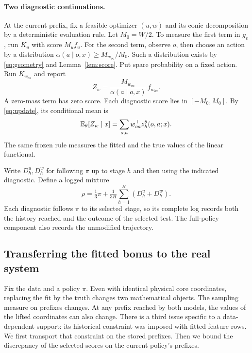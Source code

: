 \paragraph{Two diagnostic continuations.}
At the current prefix, fix a feasible optimizer $(u,w)$ and its conic decomposition by a deterministic evaluation rule. Let $M_0=W/2$. To measure the first term in $g_v$, run $K_u$ with score $M_u f_u$. For the second term, observe $o$, then choose an action by a distribution $\alpha(a\mid o,x)\ge M_{w_{oa}}/M_0$. Such a distribution exists by \eqref{eq:geometry} and Lemma~\ref{lem:score}. Put spare probability on a fixed action. Run $K_{w_{oa}}$ and report
\[
 Z_w=\frac{M_{w_{oa}}}{\alpha(a\mid o,x)}\,f_{w_{oa}} .
\]
A zero-mass term has zero score. Each diagnostic score lies in $[-M_0,M_0]$. By \eqref{eq:update}, its conditional mean is
\[
 \mathbb E_\theta[Z_w\mid x]=\sum_{o,a} w_{oa}^{\top}z_h^\theta(o,a;x).
\] The same frozen rule measures the fitted and the true values of the linear functional.

Write $D_h^u,D_h^w$ for following $\pi$ up to stage $h$ and then using the indicated diagnostic. Define a logged mixture
\begin{equation}
 \rho=\tfrac13\pi+\tfrac{1}{3H}\sum_{h=1}^H(D_h^u+D_h^w).
 \label{eq:rho}
\end{equation}
Each diagnostic follows $\pi$ to its selected stage, so its complete log records both the history reached and the outcome of the selected test. The full-policy component also records the unmodified trajectory.

\subsection{Transferring the fitted bonus to the real system}
Fix the data and a policy $\pi$. Even with identical physical core coordinates, replacing the fit by the truth changes two mathematical objects. The sampling measure on prefixes changes. At any prefix reached by both models, the values of the lifted coordinates can also change. There is a third issue specific to a data-dependent support: its historical constraint was imposed with fitted feature rows. We first transport that constraint on the stored prefixes. Then we bound the discrepancy of the selected scores on the current policy's prefixes.


